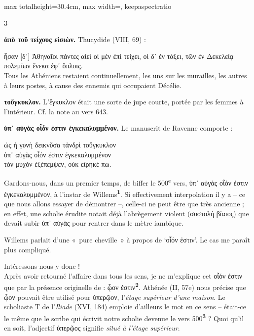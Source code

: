 \documentclass[11pt,twoside]{book}
\newcommand{\italique}[1]{\textit{#1}}
\newcommand{\citComm}[1]{\begin{quoting}[vskip=0.4pt,leftmargin=0.7em,rightmargin=0.2em]#1\end{quoting}}
\newcommand{\nieme}[1]{#1\textsuperscript{e}}
\newcommand{\francais}[1]{{\policeFr #1}}
\newcommand{\marqueur}[1]{\textsuperscript{\color{rubricRed}\textbf{#1}}}
\begin{document}
\begin{adjustbox}{max totalheight=30.4cm, max width=\textwidth, keepaspectratio}
\begin{minipage}{\textwidth}
{\begin{multicols}{3}
\par\vspace{1.5pt}
 \textbf{ἀπὸ τοῦ τείχους εἰσιὼν.} Thucydide (VIII, 69) :
\citComm{ἦσαν [δ᾽] Ἀθηναῖοι πάντες αἰεὶ οἱ μὲν ἐπὶ τείχει, οἱ δ᾽ ἐν τάξει, τῶν ἐν Δεκελείᾳ πολεμίων ἕνεκα ἐφ᾽ ὅπλοις.\\
\francais{Tous les Athéniens restaient continuellement, les uns sur les murailles, les autres à leurs postes, à cause des ennemis qui occupaient Décélie.}
}
\par\vspace{1.5pt}
 \textbf{τοὔγκυκλον.} L'ἔγκυκλον était une sorte de jupe courte, portée par les femmes à l'intérieur. Cf. la note au vers 643.
\par\vspace{1.5pt}
 \textbf{ὑπ᾽ αὐγὰς οἷόν ἐστιν ἐγκεκαλυμμένον.} Le manuscrit de Ravenne comporte :
\citComm{ὡς ἡ γυνὴ δεικνῦσα τἀνδρὶ τοὔγκυκλον\\
ὑπ᾽ αὐγὰς οἷόν ἐστιν ἐγκεκαλυμμένον\\
τὸν μυχὸν ἐξέπεμψεν, οὐκ εἴρηκέ πω.}
\par\vspace{1.5pt}
\noindent Gardons-nous, dans un premier temps, de biffer le \nieme{500} vers, ὑπ᾽ αὐγὰς οἷόν ἐστιν ἐγκεκαλυμμένον, à l'instar de Willems\marqueur{1}. Si effectivement interpolation il y a -- ce que nous allons essayer de démontrer --, celle-ci ne peut être que très ancienne ; en effet, une scholie érudite notait déjà l'abrègement violent (συστολή βίαιος) que devait subir ὑπ᾽ αὐγὰς pour rentrer dans le mètre iambique.
\par\vspace{1.5pt}
\noindent Willems parlait d'une «~pure cheville~» à propos de `οἷόν ἐστιν'. Le cas me paraît plus compliqué.
\par\vspace{1.5pt}
\noindent Intéressons-nous y donc !\\ Après avoir retourné l'affaire dans tous les sens, je ne m'explique cet οἷόν ἐστιν que par la présence originelle de : ᾦον ἐστιν\marqueur{2}. Athénée (II, 57e) nous précise que ᾦον pouvait être utilisé pour ὑπερῷον, l'\italique{étage supérieur d'une maison}. Le scholiaste T de l'\italique{Iliade} (XVI, 184) emploie d'ailleurs le mot en ce sens -- était-ce le même que le scribe qui écrivit notre scholie devenue le vers 500\marqueur{3} ? Quoi qu'il en soit, l'adjectif ὑπερῷος signifie \italique{situé à l'étage supérieur}.

\end{multicols}}
\end{minipage}
\end{adjustbox}
\end{document}
